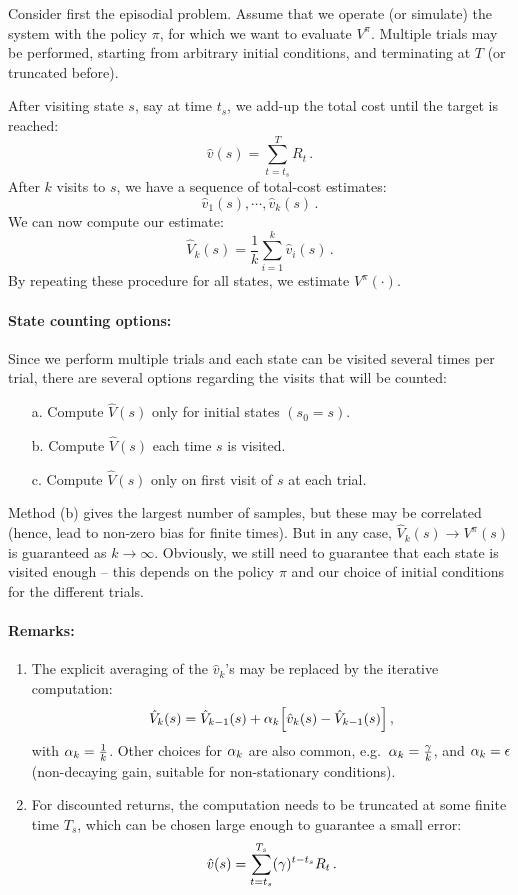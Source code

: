 Consider first the episodial problem.
Assume that we operate (or simulate) the system with the policy
$\pi$, for which we want to evaluate $V^{\pi}$.
Multiple trials may be performed, starting from arbitrary initial conditions,
and terminating at $T$ (or truncated before).

After visiting state $s$, say at time $t_s$, we add-up the total cost until the
target is reached:
$$
\hat v(s) = \sum_{t=t_s}^T R_t\,.
$$
After $k$ visits to $s$, we have a sequence of total-cost estimates:
$$
\hat v_1 (s) , \cdots, \hat v_k (s)\,.
$$
We can now compute our estimate:
$$
\hat V_k(s) = \frac{1}{k} \sum_{i=1}^k \hat v_i (s)\,.
$$
By repeating these procedure for all states,
we estimate $V^{\pi}(\cdot)$.

\paragraph{State counting options:} Since we perform multiple trials and
each state can be visited several times per trial, there are several options
regarding the visits that will be counted:
\begin{itemize} \negspace
\item[a.]
Compute $\hat V(s)$ only for initial states $(s_0=s)$.
\item[b.]
Compute $\hat V(s)$ each time $s$ is visited.
\item[c.]
Compute $\hat V(s)$ only on first visit of $s$ at each trial.
\end{itemize} \negspace
Method (b) gives the largest number of samples, but
these may be correlated (hence, lead to non-zero bias for finite times).
But in any case, $\hat V_k(s) \to V^{\pi}(s)$ is guaranteed as $k\to\infty$.
Obviously, we still need to guarantee that each state is visited enough
-- this depends on the policy $\pi$ and our choice of initial conditions
for the different trials.

\paragraph{Remarks:}
\begin{enumerate}
  \item The explicit averaging of the $\hat v_k$'s may be replaced by
the iterative computation:
$$
\hat V_k(s) = \hat V_{k-1} (s) + \alpha_k
\Bigl[\hat v_k (s) - \hat V_{k-1} (s) \Bigr] \,,
$$
with $\alpha_k=\frac{1}{k}$.  Other choices for $\alpha_k$ are also common,
e.g.\ $\alpha_k = \frac{\gamma}{k}$, and $\alpha_k=\epsilon$
(non-decaying gain, suitable for non-stationary conditions).
  \item For discounted returns, the computation needs to be truncated at some
finite time $T_s$, which can be chosen large enough to guarantee a small
error:
$$
\hat v(s) = \sum_{t=t_s}^{T_s} (\gamma)^{t-t_s} R_t\,.
$$
\end{enumerate}


